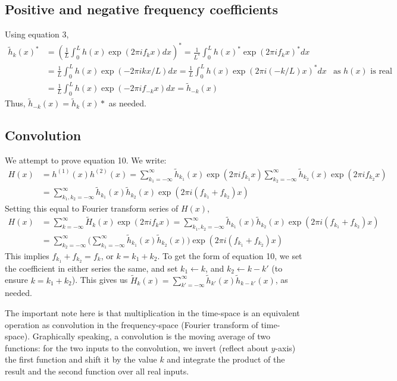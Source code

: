 \documentclass{article}
\begin{document}
\subsection{Positive and negative frequency coefficients}
Using equation 3,
\begin{align*}
\widetilde{h}_k(x)^* &= (\frac{1}{L} \int_0^L h(x) \exp(2\pi i f_k x) dx)^* = \frac{1}{L^*} \int_0^L h(x)^* \exp(2\pi i f_k x)^* dx 
\\
&= \frac{1}{L} \int_0^L h(x) \exp(-2\pi i k x / L) dx = \frac{1}{L} \int_0^L h(x) \exp(2\pi i (-k/L) x)^* dx & \text{as $h(x)$ is real}
\\
&= \frac{1}{L} \int_0^L h(x) \exp(-2\pi i f_{-k} x) dx = \widetilde{h}_{-k}(x)
\end{align*}
Thus, $\widetilde{h}_{-k}(x) = \widetilde{h}_{k}(x)*$ as needed.

\subsection{Convolution}
We attempt to prove equation 10. We write:
\begin{align*}
H(x) &= h^{(1)}(x) h^{(2)}(x) = \sum_{k_1=-\infty}^{\infty} \widetilde{h}_{k_1}(x) \exp(2\pi i f_{k_1} x) \sum_{k_2=-\infty}^{\infty} \widetilde{h}_{k_2}(x) \exp(2\pi i f_{k_2} x) 
\\
&= \sum_{k_1, k_2=-\infty}^{\infty} \widetilde{h}_{k_1}(x) \widetilde{h}_{k_2}(x) \exp(2\pi i (f_{k_1} + f_{k_2}) x)
\end{align*}
Setting this equal to Fourier transform series of $H(x)$,
\begin{align*}
H(x) &= \sum_{k=-\infty}^{\infty} \widetilde{H}_{k}(x) \exp(2\pi i f_k x) = \sum_{k_1, k_2=-\infty}^{\infty} \widetilde{h}_{k_1}(x) \widetilde{h}_{k_2}(x) \exp(2\pi i (f_{k_1} + f_{k_2}) x)
\\
&= \sum_{k_2=-\infty}^{\infty} \Big(\sum_{k_1=-\infty}^{\infty} \widetilde{h}_{k_1}(x) \widetilde{h}_{k_2}(x)\Big) \exp(2\pi i (f_{k_1} + f_{k_2}) x)
\end{align*}
This implies $f_{k_1} + f_{k_2} = f_{k}$, or $k = k_1 + k_2$. To get the form of equation 10, we set the coefficient in either series the same, and set $k_1 \leftarrow k$, and $k_2 \leftarrow k-k'$ (to ensure $k = k_1 + k_2$). This gives us $\widetilde{H}_{k}(x) = \sum_{k'=-\infty}^{\infty} \widetilde{h}_{k'}(x) \widetilde{h}_{k - k'}(x)$, as needed.

The important note here is that multiplication in the time-space is an equivalent operation as convolution in the frequency-space (Fourier transform of time-space). Graphically speaking, a convolution is the moving average of two functions: for the two inputs to the convolution, we invert (reflect about $y$-axis) the first function and shift it by the value $k$ and integrate the product of the result and the second function over all real inputs. 
\end{document}
